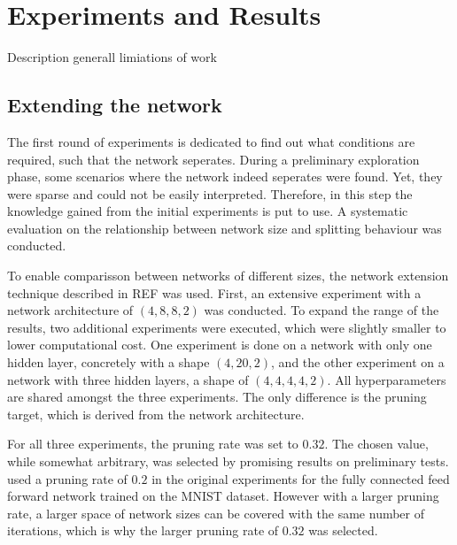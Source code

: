 \chapter{Experiments and Results}
Description generall
limiations of work

\section{Extending the network}
The first round of experiments is dedicated to find out what conditions are required, such that the network seperates.
During a preliminary exploration phase, some scenarios where the network indeed seperates were found.
Yet, they were sparse and could not be easily interpreted.
Therefore, in this step the knowledge gained from the initial experiments is put to use.
A systematic evaluation on the relationship between network size and splitting behaviour was conducted.

To enable comparisson between networks of different sizes, the network extension technique described in REF was used.
First, an extensive experiment with a network architecture of $(4,8,8,2)$ was conducted.
To expand the range of the results, two additional experiments were executed, which were slightly smaller to lower computational cost.
One experiment is done on a network with only one hidden layer, concretely with a shape $(4,20,2)$, and the other experiment on a network with three hidden layers, a shape of $(4,4,4,4,2)$.
All hyperparameters are shared amongst the three experiments.
The only difference is the pruning target, which is derived from the network architecture.

For all three experiments, the pruning rate was set to $0.32$.
The chosen value, while somewhat arbitrary, was selected by promising results on preliminary tests.
\textcite{DBLP:conf/iclr/FrankleC19} used a pruning rate of $0.2$ in the original experiments for the fully connected feed forward network trained on the MNIST dataset.
However with a larger pruning rate, a larger space of network sizes can be covered with the same number of iterations, which is why the larger pruning rate of $0.32$ was selected.

